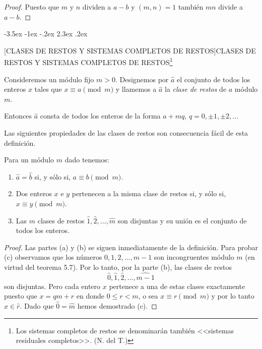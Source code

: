 \documentclass[12pt,a4paper]{book}
\makeatletter
\renewcommand\section{\@startsection{section}{1}{\z@}%
  {-3.5ex \@plus -1ex \@minus -.2ex}%
  {2.3ex \@plus .2ex}%
  {\normalfont\Large\bfseries\raggedright}}
\makeatother
\begin{document}
    \begin{proof}
        Puesto que $m$ y $n$ dividen a $a-b$ y $(m,n)=1$ también $mn$ divide a $a-b$.
    \end{proof}

    \section[CLASES DE RESTOS Y SISTEMAS COMPLETOS DE RESTOS]{CLASES DE RESTOS Y SISTEMAS COMPLETOS DE RESTOS\protect\footnote{Los sistemas completos de restos se denominarán también <<sistemas residuales completos>>. (N. del T.)}}
    \begin{definicion}
        Consideremos un módulo fijo $m>0$. Designemos por $\hat{a}$ el conjunto de todos\label{sim:hat}
        los enteros $x$ tales que $x\equiv a\pmod{m}$ y llamemos a $\hat{a}$ la
        \textit{clase de restos} de $a$ módulo $m$.
    \end{definicion}

    Entonces $\hat{a}$ consta de todos los enteros de la forma $a+mq$,
    $q=0,\pm1,\pm2,\dots$

    Las siguientes propiedades de las clases de restos son consecuencia fácil de esta
    definición.

    \begin{teorema}
        Para un módulo $m$ dado tenemos:
        \begin{enumerate}
            \item[(a)] $\hat{a}=\hat{b}$ si, y sólo si, $a\equiv b\pmod{m}$.
            \item[(b)] Dos enteros $x$ e $y$ pertenecen a la misma clase de restos si, y
            sólo si, $x\equiv y\pmod{m}$.
            \item[(c)] Las $m$ clases de restos $\hat{1},\hat{2},\dots,\hat{m}$ son
            disjuntas y su unión es el conjunto de todos los enteros.
        \end{enumerate}
    \end{teorema}

    \begin{proof}
        Las partes (a) y (b) se siguen inmediatamente de la definición. Para probar (c)
        observamos que los números $0,1,2,\dots,m-1$ son incongruentes módulo $m$ (en
        virtud del teorema 5.7). Por lo tanto, por la parte (b), las clases de restos
        \begin{equation*}
            \hat{0},\hat{1},\hat{2},\dots,\widehat{m-1}
        \end{equation*}
        son disjuntas. Pero cada entero $x$ pertenece a una de estas clases exactamente
        puesto que $x=qm+r$ en donde $0\leq r<m$, o sea $x\equiv r\pmod{m}$ y por lo
        tanto $x\in\hat{r}$. Dado que $\hat{0}=\hat{m}$ hemos demostrado (c).
    \end{proof}
\end{document}
